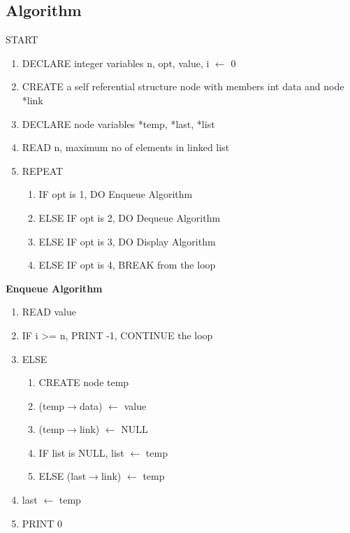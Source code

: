 \documentclass{article}
\begin{document}
\subsection{Algorithm}
START
\begin{flushleft}
\begin{enumerate}
    \item DECLARE integer variables n, opt, value, i $\leftarrow$ 0
    \item CREATE a self referential structure node with members int data and node *link
    \item DECLARE node variables *temp, *last, *list
    \item READ n, maximum no of elements in linked list
    \item REPEAT
    \begin{enumerate}
        \item IF opt is 1, DO Enqueue Algorithm
        \item ELSE IF opt is 2, DO Dequeue Algorithm
        \item ELSE IF opt is 3, DO Display Algorithm
        \item ELSE IF opt is 4, BREAK from the loop
    \end{enumerate}
\end{enumerate}
\break
\textbf{Enqueue Algorithm}
\begin{enumerate}
    \item READ value
    \item IF i >= n, PRINT -1, CONTINUE the loop
    \item ELSE 
    \begin{enumerate}
        \item CREATE node temp
        \item (temp$\rightarrow$data) $\leftarrow$ value
        \item (temp$\rightarrow$link) $\leftarrow$ NULL
        \item IF list is NULL, list $\leftarrow$ temp
        \item ELSE (last$\rightarrow$link) $\leftarrow$ temp
    \end{enumerate}
    \item last $\leftarrow$ temp
    \item PRINT 0
\end{enumerate}


\end{flushleft}
\end{document}
